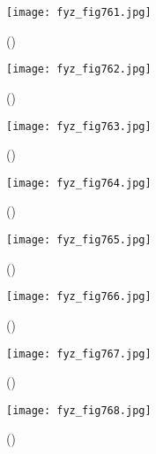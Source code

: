     \begin{figure}[ht!] %
      \centering
      \texttt{[image: fyz\_fig761.jpg]}
      \caption{
               (\cite[s.~707]{Feynman02})}
      \label{fyz:fig761}
    \end{figure}

    \begin{figure}[ht!] %
      \centering
      \texttt{[image: fyz\_fig762.jpg]}
      \caption{
               (\cite[s.~707]{Feynman02})}
      \label{fyz:fig762}
    \end{figure}

    \begin{figure}[ht!] %
      \centering
      \texttt{[image: fyz\_fig763.jpg]}
      \caption{
               (\cite[s.~707]{Feynman02})}
      \label{fyz:fig763}
    \end{figure}

    \begin{figure}[ht!] %
      \centering
      \texttt{[image: fyz\_fig764.jpg]}
      \caption{
               (\cite[s.~707]{Feynman02})}
      \label{fyz:fig764}
    \end{figure}

    \begin{figure}[ht!] %
      \centering
      \texttt{[image: fyz\_fig765.jpg]}
      \caption{
               (\cite[s.~707]{Feynman02})}
      \label{fyz:fig765}
    \end{figure}
    
    \begin{figure}[ht!] %
      \centering
      \texttt{[image: fyz\_fig766.jpg]}
      \caption{
               (\cite[s.~707]{Feynman02})}
      \label{fyz:fig766}
    \end{figure}

    \begin{figure}[ht!] %
      \centering
      \texttt{[image: fyz\_fig767.jpg]}
      \caption{
               (\cite[s.~707]{Feynman02})}
      \label{fyz:fig767}
    \end{figure}

    \begin{figure}[ht!] %
      \centering
      \texttt{[image: fyz\_fig768.jpg]}
      \caption{
               (\cite[s.~707]{Feynman02})}
      \label{fyz:fig768}
    \end{figure}

